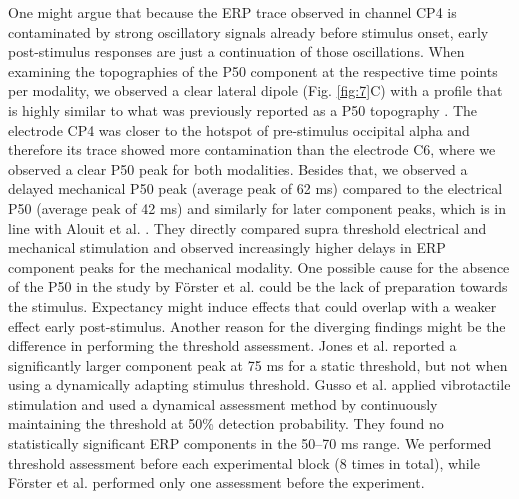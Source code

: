 \documentclass[11pt,a4paper,onecolumn]{article}
\begin{document}
One might argue that because the ERP trace observed in channel CP4 is contaminated by strong oscillatory signals already before stimulus onset, early post-stimulus responses are just a continuation of those oscillations. When examining the topographies of the P50 component at the respective time points per modality, we observed a clear lateral dipole (Fig. \ref{fig:7}C) with a profile that is highly similar to what was previously reported as a P50 topography \cite{forschackDissociableNeuralCorrelates2020, schroderDissociatingPerceptualAwareness2021}. 
The electrode CP4 was closer to the hotspot of pre-stimulus occipital alpha and therefore its trace showed more contamination than the electrode C6, where we observed a clear P50 peak for both modalities.
Besides that, we observed a delayed mechanical P50 peak (average peak of 62 ms) compared to the electrical P50 (average peak of 42 ms) and similarly for later component peaks, which is in line with Alouit et al. \cite{alouitCorticalActivationsInduced2025}. They directly compared supra threshold electrical and mechanical stimulation and observed increasingly higher delays in ERP component peaks for the mechanical modality. 
One possible cause for the absence of the P50 in the study by Förster et al. \cite{forsterERPResponsesReveal2025} could be the lack of preparation towards the stimulus. 
Expectancy might induce effects that could overlap with a weaker effect early post-stimulus. 
Another reason for the diverging findings might be the difference in performing the threshold assessment. 
Jones et al. \cite{jonesNeuralCorrelatesTactile2007} reported a significantly larger component peak at 75 ms for a static threshold, but not when using a dynamically adapting stimulus threshold. 
Gusso et al. \cite{gussoMoreFeelingScalp2021} applied vibrotactile stimulation and used a dynamical assessment method by continuously maintaining the threshold at 50\% detection probability. They found no statistically significant ERP components in the 50–70 ms range. 
We performed threshold assessment before each experimental block (8 times in total), while Förster et al. \cite{forsterERPResponsesReveal2025} performed only one assessment before the experiment.
\end{document}
